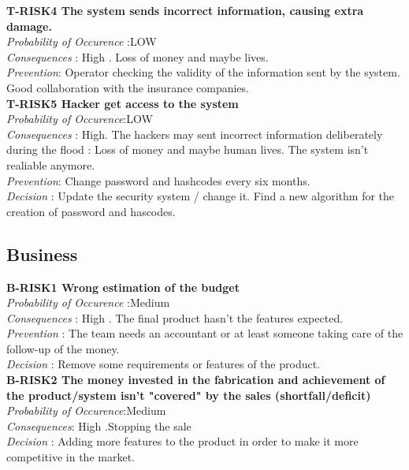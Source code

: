 	\textbf{ T-RISK4 The system sends incorrect information, causing extra damage.} \\
	\textit{Probability of Occurence} :LOW\\
	\textit{Consequences} : High . Loss of money and maybe lives.\\
	\textit{Prevention}: Operator checking the validity of the information sent by the system.\\
	Good collaboration with the insurance companies. \\

	\textbf{ T-RISK5 Hacker get access to the system} \\
	\textit{Probability of Occurence}:LOW \\
	\textit{Consequences} : High. The hackers may sent incorrect information deliberately during the flood : Loss of money and maybe human lives. The system isn't realiable anymore. \\
	\textit{Prevention}: Change password and hashcodes every six months. \\
	\textit{Decision} : Update the security system / change it. Find a new algorithm for the creation of password and hascodes. \\


\subsection{Business}

	\textbf{ B-RISK1 Wrong estimation of the budget} \\
	\textit{Probability of Occurence} :Medium \\
	\textit{Consequences} : High . The final product hasn't the features expected. \\
	\textit{Prevention} : The team needs an accountant or at least someone taking care of the follow-up of the money. \\
	\textit{Decision} : Remove some requirements or features of the product. \\
	
	
	\textbf{ B-RISK2 The money invested in the fabrication and achievement of the product/system isn't "covered" by the sales (shortfall/deficit)} \\
	\textit{Probability of Occurence}:Medium \\
	\textit{Consequences}: High .Stopping the sale \\
	\textit{Decision} : Adding more features to the product in order to make it more competitive in the market. \\
	

